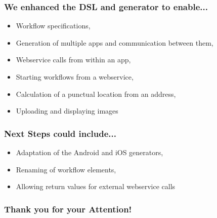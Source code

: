 \begin{frame}[t]
    \frametitle{We enhanced the DSL and generator to enable...}
    
    \begin{itemize}
    	\item Workflow specifications,
    	\item Generation of multiple apps and communication between them,
    	\item Webservice calls from within an app,
    	\item Starting workflows from a webservice,
    	\item Calculation of a punctual location from an address,
    	\item Uploading and displaying images
    \end{itemize}

\end{frame}

\begin{frame}[t]
    \frametitle{Next Steps could include...}

	\begin{itemize}
		\item Adaptation of the Android and iOS generators,
		\item Renaming of workflow elements,
		\item Allowing return values for external webservice calls
	\end{itemize}
\end{frame}

\begin{frame}
\frametitle{Thank you for your Attention!}
	\begin{center}
	\end{center}
\end{frame}

